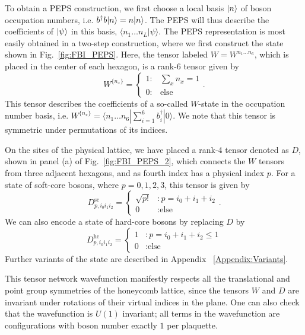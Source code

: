 To obtain a PEPS construction, we first choose a local basis $\vert n \rangle$
of boson occupation numbers, i.e. $b^\dagger b \vert n \rangle = n \vert n \rangle$.
The PEPS will thus describe the coefficients of $\vert \psi \rangle$ in this
basis, $\langle n_1 \ldots n_L | \psi \rangle$. The PEPS
representation is most easily obtained in a two-step construction,
where we first construct the state shown in Fig.~\ref{fig:FBI_PEPS}.
Here, the tensor labeled $W=W^{n_1 \ldots n_6}$, which is placed in
the center of each hexagon, is a rank-6 tensor given by
\begin{equation}
W^{\{n_x\}}  = \left\{ \begin{array}{lr}
													1  : & \sum\limits_x n_x = 1 \\
													0  : & \text{else}
													\end{array} \right. .
\end{equation}
This tensor describes the coefficients of a so-called $W$-state in the
occupation number basis, i.e. $W^{\lbrace n_x\rbrace }= \langle n_1
\ldots n_6 | \sum_{i=1}^6 b_i^\dagger |0\rangle$. We note that this
tensor is symmetric under permutations of its indices.

On the sites of the physical lattice, we have placed a rank-4 tensor
denoted as $D$, shown in panel (a) of Fig.~\ref{fig:FBI_PEPS_2}, which
connects the $W$ tensors from three adjacent hexagons, and as fourth
index has a physical index $p$. For a state of soft-core bosons, where
$p=0,1,2,3$, this tensor is given by
\begin{equation} \label{eqn:D}
D^\mathrm{sc}_{p, i_0 i_1 i_2}  = \left\{ \begin{array}{ll}
													\sqrt{p!}  &: p =i_0+i_1+i_2  \\
													0  &:  \text{else}
													\end{array}
											\right. .
\end{equation}
We can also encode a state of hard-core bosons by replacing $D$ by
\begin{equation}
D^\mathrm{hc}_{p, i_0 i_1 i_2}  = \left\{ \begin{array}{ll}
													1  &: p = i_0+i_1+i_2 \le 1  \\
													0  &:  \text{else}
													\end{array}
											\right.
\end{equation}
Further variants of the state are described in
Appendix ~\ref{Appendix:Variants}.

This tensor network wavefunction manifestly respects all the
translational and point group symmetries of the honeycomb lattice,
since the tensors $W$ and $D$ are invariant under rotations of their
virtual indices in the plane. One can also check that the
wavefunction is $U(1)$ invariant; all terms in the wavefunction are
configurations with boson number exactly $1$ per plaquette.


